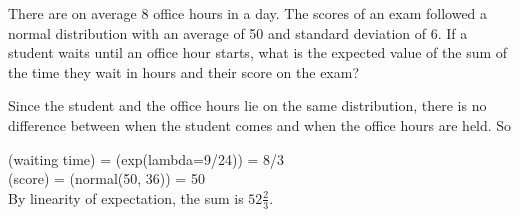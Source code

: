 \question There are on average 8 office hours in a day. The scores of an exam 
followed a normal distribution with an average of 50 and standard 
deviation of 6. If a student waits until an office hour starts, what 
is the expected value of the sum of the time they wait in hours and 
their score on the exam?

\begin{solution}[0.5cm]
Since the student and the office hours lie on the same distribution, there is no
difference between when the student comes and when the office hours are held. So

\E(waiting time) = \E(exp(lambda=9/24)) = 8/3 \\
\E(score) = \E(normal(50, 36)) = 50 \\
By linearity of expectation, the sum is $52 \frac{2}{3}$.
\end{solution}
 